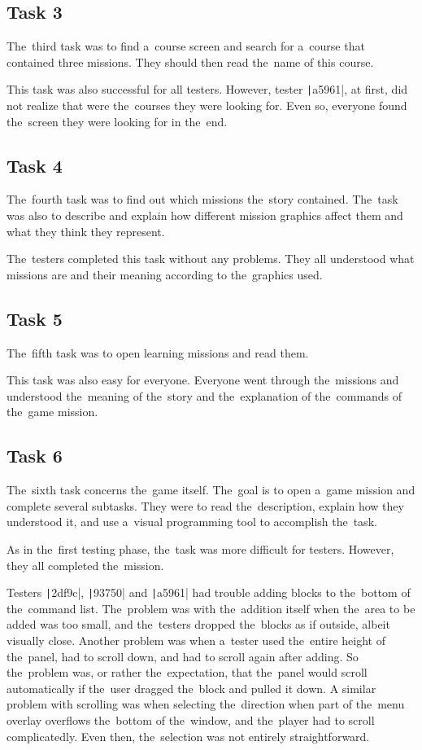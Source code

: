 \subsection*{Task 3}

The~third task was to find a~course screen and search for a~course that contained three missions.
They should then read the~name of this course.

This task was also successful for all testers.
However, tester \texttt|a5961|, at first, did not realize that  were the~courses they were looking for.
Even so, everyone found the~screen they were looking for in the~end.

\subsection*{Task 4}

The~fourth task was to find out which missions the~story contained.
The~task was also to describe and explain how different mission graphics affect them and what they think they represent.

The~testers completed this task without any problems.
They all understood what missions are and their meaning according to the~graphics used.

\subsection*{Task 5}

The~fifth task was to open learning missions and read them.

This task was also easy for everyone.
Everyone went through the~missions and understood the~meaning of the~story and the~explanation of the~commands of the~game mission.

\subsection*{Task 6}

The~sixth task concerns the~game itself.
The~goal is to open a~game mission and complete several subtasks.
They were to read the~description, explain how they understood it, and use a~visual programming tool to accomplish the~task.

As in the~first testing phase, the~task was more difficult for testers.
However, they all completed the~mission.

Testers \texttt|2df9c|, \texttt|93750| and \texttt|a5961| had trouble adding blocks to the~bottom of the~command list.
The~problem was with the~addition itself when the~area to be added was too small, and the~testers dropped the~blocks as if outside, albeit visually close.
Another problem was when a~tester used the~entire height of the~panel, had to scroll down, and had to scroll again after adding.
So the~problem was, or rather the~expectation, that the~panel would scroll automatically if the~user dragged the~block and pulled it down.
A similar problem with scrolling was when selecting the~direction when part of the~menu overlay overflows the~bottom of the~window, and the~player had to scroll complicatedly. Even then, the~selection was not entirely straightforward.

